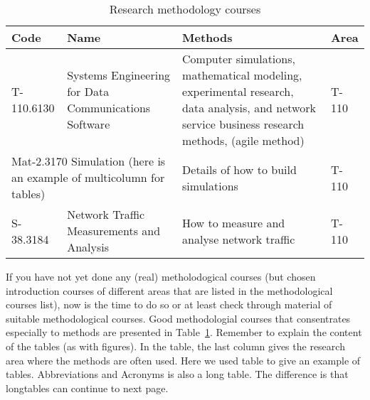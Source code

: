 \documentclass[12pt,a4paper,oneside,pdftex]{report}
\begin{document}
\begin{table}
\begin{tabular}{|p{2cm}|p{3.8cm}|p{4.5cm}|p{1.1cm}|}
\hline %
\textbf{Code} & \textbf{Name} & \textbf{Methods} & \textbf{Area} \\
\hline
T-110.6130 & Systems Engineering for Data Communications
    Software & \raggedright Computer simulations, mathematical modeling,
  experimental research, data analysis, and network service business
  research methods, (agile method) & T-110 \\
\hline
\multicolumn{2}{|p{6.25cm}|}{Mat-2.3170 Simulation (here is an example of
 multicolumn for tables)}& Details of how to build simulations & T-110 \\
\hline
S-38.3184 & Network Traffic Measurements and Analysis
& \raggedright How to measure and analyse network
  traffic & T-110 \\ \hline
\end{tabular} %
\caption{Research methodology courses}
\label{table:courses}
\end{table} %

If you have not yet done any (real) metholodogical courses (but chosen
introduction courses of different areas that are listed in the
methodological courses list), now is the time to do so or at least
check through material of suitable methodological courses. Good
methodologial courses that consentrates especially to methods are
presented in Table~\ref{table:courses}. Remember to explain the
content of the tables (as with figures). In the table, the last column
gives the research area where the methods are often used. Here we used
table to give an example of tables. Abbreviations and Acronyms is also
a long table. The difference is that longtables can continue to next
page.
\end{document}

